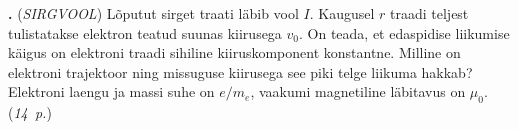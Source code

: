 \documentclass[11pt,a5paper]{article}
\newcommand{\numb}[1]{\vspace{5pt}\textbf{\large #1}}
\newcommand{\nimi}[1]{(\textsl{\small #1})}
\newcommand{\punktid}[1]{(\emph{#1~p.})}
\newcounter{ylesanne}
\newcommand{\yl}[1]{\addtocounter{ylesanne}{1}\numb{\theylesanne.} \nimi{#1} \newblock{}}
\newcommand{\autor}[1]{}
\begin{document}
\yl{SIRGVOOL}
Lõputut sirget traati läbib vool $I$. Kaugusel $r$ traadi teljest tulistatakse elektron teatud suunas kiirusega $v_0$. On teada, et edaspidise liikumise käigus on elektroni traadi sihiline kiiruskomponent konstantne. Milline on elektroni trajektoor ning missuguse kiirusega see piki telge liikuma hakkab? Elektroni laengu ja massi suhe on $e/m_e$, vaakumi magnetiline läbitavus on $\mu_0$.
\punktid{14} \autor{Taavet Kalda}
\end{document}
